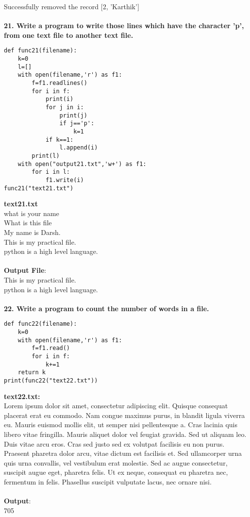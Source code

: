 \documentclass[
a4paper]{article}
\begin{document}
\begin{large}
Successfully removed the record $[$2, 'Karthik'$]$\\
\\\textbf{21. Write a program to write those lines which have the character 'p', from one text file to another text file.}
\begin{verbatim}
def func21(filename):
    k=0
    l=[]
    with open(filename,'r') as f1:
        f=f1.readlines()
        for i in f:
            print(i)
            for j in i:
                print(j)
                if j=='p':
                    k=1
            if k==1:
                l.append(i)
        print(l)
    with open("output21.txt",'w+') as f1:
        for i in l:
            f1.write(i)
func21("text21.txt")
\end{verbatim}
\textbf{text21.txt}\\
what is your name\\
What is this file\\
My name is Darsh.\\
This is my practical file.\\
python is a high level language.\\
\\
\textbf{Output File}:\\
This is my practical file.\\
python is a high level language.\\
\\\textbf{22. Write a program to count the number of words in a file.}
\begin{verbatim}
def func22(filename):
    k=0
    with open(filename,'r') as f1:
        f=f1.read()
        for i in f:
            k+=1
    return k
print(func22("text22.txt"))
\end{verbatim}
\textbf{text22.txt:}\\
Lorem ipsum dolor sit amet, consectetur adipiscing elit. Quisque consequat placerat erat eu commodo. Nam congue maximus purus, in blandit ligula viverra eu. Mauris euismod mollis elit, ut semper nisi pellentesque a. Cras lacinia quis libero vitae fringilla. Mauris aliquet dolor vel feugiat gravida. Sed ut aliquam leo. Duis vitae arcu eros. Cras sed justo sed ex volutpat facilisis eu non purus. Praesent pharetra dolor arcu, vitae dictum est facilisis et. Sed ullamcorper urna quis urna convallis, vel vestibulum erat molestie. Sed ac augue consectetur, suscipit augue eget, pharetra felis. Ut ex neque, consequat eu pharetra nec, fermentum in felis. Phasellus suscipit vulputate lacus, nec ornare nisi.\\
\\
\textbf{Output}:\\
705\\
    \end{large}	
\end{document}
